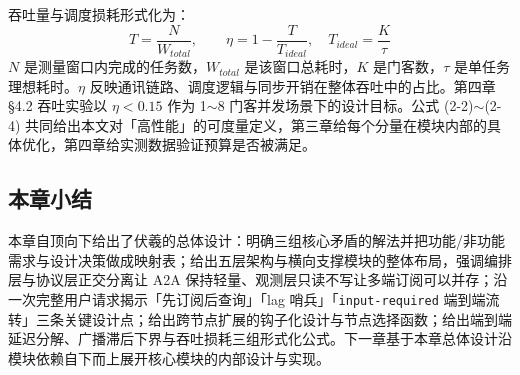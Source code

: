 吞吐量与调度损耗形式化为：
\begin{equation}
T = \frac{N}{W_{total}}, \qquad \eta = 1 - \frac{T}{T_{ideal}}, \quad T_{ideal} = \frac{K}{\tau}
\end{equation}
$N$ 是测量窗口内完成的任务数，$W_{total}$ 是该窗口总耗时，$K$ 是门客数，$\tau$ 是单任务理想耗时。$\eta$ 反映通讯链路、调度逻辑与同步开销在整体吞吐中的占比\parencite{kreps2011kafka}。第四章 §4.2 吞吐实验以 $\eta < 0.15$ 作为 1$\sim$8 门客并发场景下的设计目标。公式 (2-2)$\sim$(2-4) 共同给出本文对「高性能」的可度量定义，第三章给每个分量在模块内部的具体优化，第四章给实测数据验证预算是否被满足。

\subsection{本章小结}

本章自顶向下给出了伏羲的总体设计：明确三组核心矛盾的解法并把功能/非功能需求与设计决策做成映射表；给出五层架构与横向支撑模块的整体布局，强调编排层与协议层正交分离让 A2A 保持轻量、观测层只读不写让多端订阅可以并存；沿一次完整用户请求揭示「先订阅后查询」「lag 哨兵」「\texttt{input-required} 端到端流转」三条关键设计点；给出跨节点扩展的钩子化设计与节点选择函数；给出端到端延迟分解、广播滞后下界与吞吐损耗三组形式化公式。下一章基于本章总体设计沿模块依赖自下而上展开核心模块的内部设计与实现。

